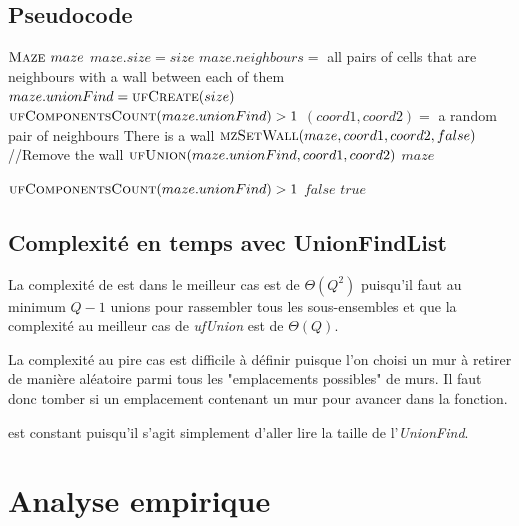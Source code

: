 \subsection{Pseudocode} %
\begin{codebox}
\li $\textnormal{\scshape Maze } maze$
\li $maze.size = size$
\li $maze.neighbours =$ all pairs of cells that are neighbours with a wall between each of them
\li $maze.unionFind = \textnormal{\scshape ufCreate}(size)$
\li \While $\textnormal{\scshape ufComponentsCount}(maze.unionFind) > 1$
\Do
\li 	$(coord1, coord2) =$ a random pair of neighbours
\li		\If There is a wall
\li \Then $\textnormal{\scshape mzSetWall}(maze, coord1, coord2, false)$ //Remove the wall
\li	$\textnormal{\scshape ufUnion}(maze.unionFind, coord1, coord2)$
\End
\End
\li \Return $maze$
\End
\end{codebox}

\begin{codebox}
\li \If $\textnormal{\scshape ufComponentsCount}(maze.unionFind) > 1$
\li \Then \Return $false$
\li \Else
\li \Return $true$
\End
\End
\end{codebox}
	
\subsection{Complexité en temps avec UnionFindList} %
La complexité de  est dans le meilleur cas est de $\Theta(Q^2)$ puisqu'il faut au minimum $Q-1$ unions pour rassembler tous les sous-ensembles et que la complexité au meilleur cas de \textit{ufUnion} est de $\Theta(Q)$.

La complexité au pire cas est difficile à définir puisque l'on choisi un mur à retirer de manière aléatoire parmi tous les "emplacements possibles" de murs. Il faut donc tomber si un emplacement contenant un mur pour avancer dans la fonction.

\bigbreak
{} est constant puisqu'il s'agit simplement d'aller lire la taille de l'\textit{UnionFind}.

\section{Analyse empirique}
